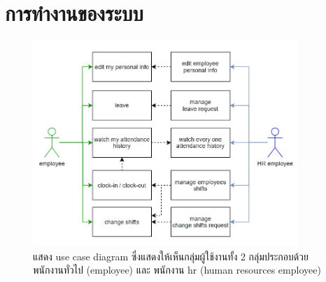 \section{การทำงานของระบบ}
\begin{figure}
\begin{center}
\includegraphics[width=10cm,keepaspectratio]{./images/penhwang_er_diagram_2.jpg}
\end{center}
\caption[แสดง use case diagram]{แสดง use case diagram ซึ่งแสดงให้เห็นกลุ่มผู้ใช้งานทั้ง 2 กลุ่มประกอบด้วย พนักงานทั่วไป (employee) และ พนักงาน hr (human resources employee)}
\end{figure}

